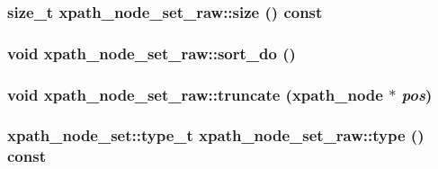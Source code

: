 \label{classxpath__node__set__raw_ae73780271d772967f78ddd7b9376cdab}
\hypertarget{classxpath__node__set__raw_a7121a0eb1af207606b9613747834f3bd}{
\subsubsection[{size}]{\setlength{\rightskip}{0pt plus 5cm}size\_\-t xpath\_\-node\_\-set\_\-raw::size () const}}
\label{classxpath__node__set__raw_a7121a0eb1af207606b9613747834f3bd}
\hypertarget{classxpath__node__set__raw_a5e46ee306afc24ea83f6c1181bba3600}{
\subsubsection[{sort\_\-do}]{\setlength{\rightskip}{0pt plus 5cm}void xpath\_\-node\_\-set\_\-raw::sort\_\-do ()}}
\label{classxpath__node__set__raw_a5e46ee306afc24ea83f6c1181bba3600}
\hypertarget{classxpath__node__set__raw_aba48d228f554065702f3e6d5059f701d}{
\subsubsection[{truncate}]{\setlength{\rightskip}{0pt plus 5cm}void xpath\_\-node\_\-set\_\-raw::truncate (xpath\_\-node $\ast$ {\em pos})}}
\label{classxpath__node__set__raw_aba48d228f554065702f3e6d5059f701d}
\hypertarget{classxpath__node__set__raw_a9c1dceb2d9a8e0747380bd12968fc9d8}{
\subsubsection[{type}]{\setlength{\rightskip}{0pt plus 5cm}xpath\_\-node\_\-set::type\_\-t xpath\_\-node\_\-set\_\-raw::type () const}}
\label{classxpath__node__set__raw_a9c1dceb2d9a8e0747380bd12968fc9d8}


